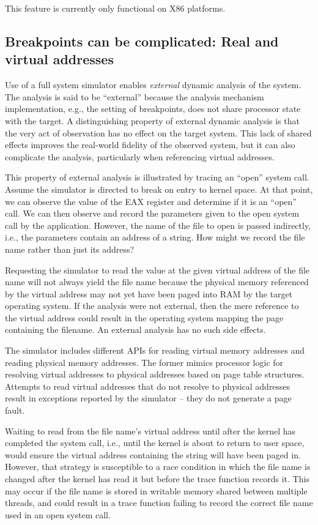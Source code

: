\documentclass[titlepage]{article}
\begin{document}
\begin{appendices}
This feature is currently only functional on X86 platforms.

\subsection{Breakpoints can be complicated: Real and virtual addresses}
\label{external}
Use of a full system simulator enables \textit{external} dynamic analysis of the system.  The analysis is said to be
“external” because the analysis mechanism implementation, e.g., the setting of breakpoints,  does not 
share processor state with the target.
A distinguishing property of external dynamic analysis is that the very act of observation has no effect on the target
system.  This lack of shared effects improves the real-world fidelity of the observed system, but it can also complicate the
analysis, particularly when referencing virtual addresses. 

This property of external analysis is illustrated by tracing an “open” system call. 
Assume the simulator is directed to break on entry to kernel space.  At that point, we can observe the value
of the EAX register and determine if it is an “open” call.  We can then observe and record the
parameters given to the open system call by the application.  However, the name of the file to open
is passed indirectly, i.e., the parameters contain an address of a string.  How might we record
the file name rather than just its address?   

Requesting the simulator to read the value at the given virtual address of the
file name will not always yield the file name because the
physical memory referenced by the virtual address may not yet have been paged into RAM by the target operating system.
If the analysis were not external, then the mere reference to the virtual address could result in the
operating system mapping the page containing the filename.  An external analysis has no such side effects.

The simulator includes different APIs for reading virtual memory addresses and reading physical memory addresses.
The former mimics processor logic for resolving virtual addresses to physical addresses based on page table
structures. Attempts to read virtual addresses that do not resolve to physical addresses result in exceptions reported
by the simulator -- they do not generate a page fault.

Waiting to read from the file name's virtual address until after the kernel has completed the system call, i.e.,
until the kernel is about to return to user space, would ensure the virtual address containing the string
will have been paged in.  However, that strategy is susceptible to a race condition in which the file
name is changed after the kernel has read it but before the trace function records it.  This may occur
if the file name is stored in writable memory shared between multiple threads, and could result in a trace function
failing to record the correct file name used in an open system call.
 

\end{appendices}
\end{document}
